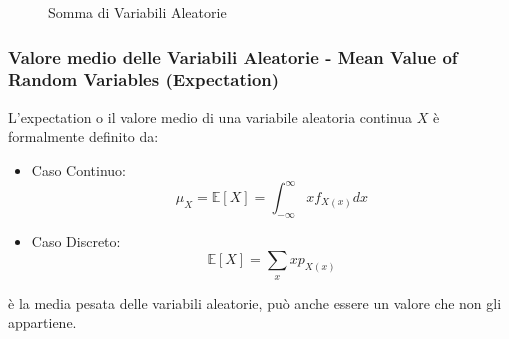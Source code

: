 \begin{figure}[H]
{
                }

                \caption{Somma di Variabili Aleatorie}
                \label{Somma di Variabili Aleatorie}
            \end{figure}
        \subsubsection{Valore medio delle Variabili Aleatorie - Mean Value of Random Variables (Expectation)}\label{Expectation}
            L'expectation o il valore medio di una variabile aleatoria continua $X$ è formalmente definito da:
            \begin{itemize}
                \item {Caso Continuo:
                    \[
                        \mu_X = \mathbb{E}[X] = \int_{-\infty}^{\infty} xf_{X(x)}dx
                    \]
                }
                \item {Caso Discreto:
                    \[
                        \mathbb{E}[X] = \sum_{x}xp_{X(x)}
                    \]
                }
            \end{itemize}
            è la media pesata delle variabili aleatorie, può anche essere un valore che non gli appartiene.
